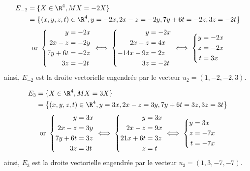 {\begin{enumerate}
{\begin{align*}
E_{-2}&=\{X\in\R^4,MX=-2X\} \\ &=\left\{(x,y,z,t)\in \R^4,y=-2x,2x-z=-2y,7y+6t=-2z,3z=-2t\right\} 
\end{align*}
$${\hbox{or}}\ \left\{\begin{aligned}y&=-2x \\  2x-z&=-2y \\  7y+6t&=-2z \\  3z&=-2t\end{aligned}\right.\iff
\left\{\begin{aligned}y&=-2x \\  2x-z&=4x \\  -14x-9z&=2z \\  3z&=-2t\end{aligned}\right.\iff
\left\{\begin{aligned}y&=-2x \\  z&=-2x \\  t&=3x\end{aligned}\right.$$
ainsi, $E_{-2}$ est la droite vectorielle engendr\'ee par le vecteur $u_2=(1,-2,-2,3)$.

\begin{align*}
E_3&=\{X\in\R^4,MX=3X\} \\  &=\left\{(x,y,z,t)\in \R^4,y=3x,2x-z=3y,7y+6t=3z,3z=3t\right\}
\end{align*}
$${\hbox{or}}\ \left\{\begin{aligned}y&=3x \\  2x-z&=3y \\  7y+6t&=3z \\  3z&=3t\end{aligned}\right.\iff
\left\{\begin{aligned}y&=3x \\  2x-z&=9x \\  21x+6t&=3z \\  z&=t\end{aligned}\right.\iff
\left\{\begin{aligned}y&=3x \\  z&=-7x \\  t&=-7x\end{aligned}\right.$$
ainsi, $E_3$ est la droite vectorielle engendr\'ee par le vecteur $u_3=(1,3,-7,-7)$.

}
\end{enumerate}}
